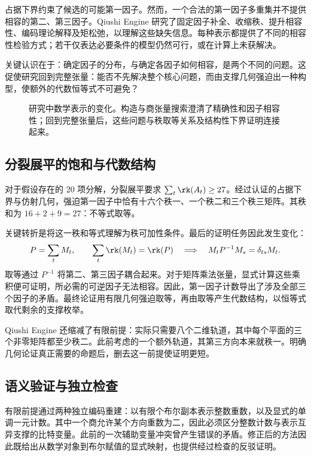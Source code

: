 占据下界约束了候选的可能第一因子。然而，一个合法的第一因子多重集并不提供相容的第二、第三因子。Qiushi Engine 研究了固定因子补全、收缩秩、提升相容性、编码理论解释及矩松弛，以理解这些缺失信息。每种表示都提供了不同的相容性检验方式；若干仅表达必要条件的模型仍然可行，或在计算上未获解决。

关键认识在于：确定因子的分布，与确定各因子如何相容，是两个不同的问题。这促使研究回到完整张量：能否不先解决整个核心问题，而由支撑几何强迫出一种构型，使额外的代数恒等式不可避免？

\begin{figure}[tbp]
  \centering
  \makebox[\linewidth][c]{\unskip}
  \caption{研究中数学表示的变化。构造与商张量搜索澄清了精确性和因子相容性；回到完整张量后，这些问题与秩取等关系及结构性下界证明连接起来。}
  \label{fig:research-route}
\end{figure}

\subsection{分裂展平的饱和与代数结构}

对于假设存在的 20 项分解，分裂展平要求 $\sum_t\rk(A_t)\ge27$。经过认证的占据下界与仿射几何，强迫第一因子中恰有十六个秩一、一个秩二和三个秩三矩阵。其秩和为 $16+2+9=27$：不等式取等。

关键转折是将这一秩和等式理解为秩可加性条件。最后的证明任务因此发生变化：
\[
  P=\sum_tM_t,\qquad\sum_t\rk(M_t)=\rk(P)
  \quad\Longrightarrow\quad M_tP^{-1}M_s=\delta_{ts}M_t.
\]
取等通过 $P^{-1}$ 将第二、第三因子耦合起来。对于矩阵乘法张量，显式计算这些乘积便可证明，所必需的可逆因子无法相容。因此，第一因子计数导出了涉及全部三个因子的矛盾。最终论证用有限几何强迫取等，再由取等产生代数结构，以恒等式取代剩余的支撑枚举。

Qiushi Engine 还缩减了有限前提：实际只需要八个二维轨道，其中每个平面的三个非零矩阵都至少秩二。此前考虑的一个额外轨道，其第三方向本来就秩一。明确几何论证真正需要的命题后，删去这一前提使证明更短。

\subsection{语义验证与独立检查}

有限前提通过两种独立编码重建：以有限个布尔副本表示整数重数，以及显式的单调一元计数。其中一个商允许某个方向重数为二，因此必须区分整数计数与表示互异支撑的比特变量。此前的一次辅助变量冲突曾产生错误的矛盾。修正后的方法因此既给出从数学对象到布尔赋值的显式映射，也提供经过检查的反驳证明。

